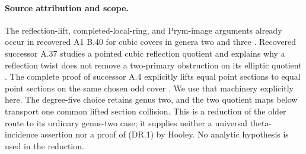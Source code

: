 \paragraph{Source attribution and scope.}
The reflection-lift, completed-local-ring, and Prym-image arguments
already occur in recovered A1 B.40 for cubic covers in genera two and
three \cite[B.40]{A1run}.  Recovered successor A.37 studies a pointed
cubic reflection quotient and explains why a reflection twist does not
remove a two-primary obstruction on its elliptic quotient
\cite[A.37]{ASrun}.  The complete proof of successor A.4 explicitly
lifts equal point sections to equal point sections on the same chosen
odd cover \cite[A.4]{ASrun}.  We use that machinery explicitly here.  The
degree-five choice retains genus two, and the two quotient maps below
transport one common lifted section collision.  This is a reduction of
the older route to its ordinary genus-two case; it supplies neither a
universal theta-incidence assertion nor a proof of (DR.1) by Hooley.
No analytic hypothesis is used in the reduction.

